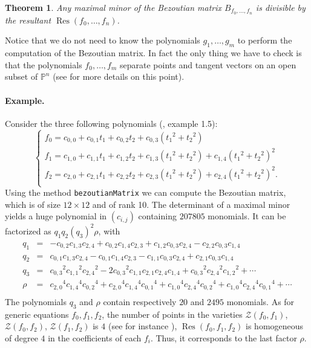 \documentclass[10pt]{amsart}
\theoremstyle{plain}
\newtheorem{thm}{Theorem}[section]
\theoremstyle{definition}
\def\PP{{\mathbb{P}}}
\def\Zc{{\mathcal{Z}}}
\DeclareMathOperator\Res{Res}
\begin{document}
\begin{thm}
  Any maximal minor of the Bezoutian matrix
  $B_{{f}_{0},\ldots,{f}_{n}}$ is divisible by the resultant
  $\Res(f_0,\ldots,f_n)$.
\end{thm}

Notice that we do not need to know the polynomials $g_1,\ldots,g_m$ to perform the computation of the Bezoutian matrix. In fact the only thing we have to check is that the polynomials $f_0,\ldots,f_m$ separate points and tangent vectors on an open subset of $\PP^n$ (see \cite{BEM00} for more details on this point).

\paragraph{Example.} Consider the three following polynomials (\cite{BEM00}, example 1.5):
$$ \left\{
\begin{array}{l}
f_{0} = c_{{0,0}}+c_{{0,1}}t_{1}+c_{{0,2}}t_2+c_{{0,3}}({t_{1}}^{2}+{t_2}^{2})\\
f_{1} = c_{{1,0}}+c_{{1,1}}t_{1}+c_{{1,2}}t_2+c_{{1,3}}({t_{1}}^{2}+{t_2}^{2})
+c_{1,4}({t_{1}}^{2} +{t_2}^{2})^{2} \\
f_{2} =  c_{{2,0}}+c_{{2,1}}t_{1}+c_{{2,2}}t_2+c_{{2,3}}({t_{1}}^{2}+{t_2}^{2})
+c_{2,4}({t_{1}}^{2} +{t_2}^{2})^{2}. \\
\end{array} \right.
$$ 
Using the method {\tt bezoutianMatrix} we can compute the Bezoutian matrix, which is of size $12\times 12$ and of rank 10. The determinant of a maximal minor yields a huge polynomial  in $(c_{i,j})$ containing $2
07805$ monomials. It can be factorized as $q_1q_2(q_{3})^{2}\rho$, with 
$$
\begin{array}{lll}
q_1 & = & -c_{{0,2}}c_{{1,3}}c_{{2,4}}+c_{{0,2}}c_{{1,4}}c_{{2,3}}+c_{{1,2}}c_{{
0,3}}c_{{2,4}}-c_{{2,2}}c_{{0,3}}c_{{1,4}}  \\

q_2 & = & c_{{0,1}}c_{{1,3}}c_{{2,4}}-c_{{0,1}}c_{{1,4}}c_{{2,3}}-c_{{1,1}}c_{{0
,3}}c_{{2,4}}+c_{{2,1}}c_{{0,3}}c_{{1,4}}  \\

q_3 & = & {c_{{0,3}}}^{2}{c_{{1,1}}}^{2}{c_{{2,4}}}^{2} -2{c_{{0,3}}}^{2}c_{{1,1
}}c_{{2,1}}c_{{2,4}}c_{{1,4}} + {c_{{0,3}}}^{2}{c_{{2,4}}}^{2}{c_{{1,2}}}^{2} + 
\cdots \\

\rho & = &  {c_{{2,0}}}^{4}{c_{{1,4}}}^{4}{c_{{0,2}}}^{4} + {c_{{2,0}}}^{4}{c_{{1,4
}}}^{4}{c_{{0,1}}}^{4} + {c_{{1,0}}}^{4}{c_{{2,4}}}^{4}{c_{{0,2}}}^{4} + {c_{{1,
0}}}^{4}{c_{{2,4}}}^{4}{c_{{0,1}}}^{4} + \cdots \\
\end{array}
$$
The polynomials $q_{3}$ and $\rho$ contain respectively $20$ and $2495$
monomials. As for generic equations $f_{0}, f_{1}, f_{2}$,
the number of points in the varieties $\Zc(f_{0},f_{1})$,
$\Zc(f_{0},f_{2})$, $\Zc(f_{1},f_{2})$ is $4$ (see for instance
\cite{MB94mega}), 
 $\Res(f_{0},f_{1},f_{2})$ is homogeneous of degree
$4$ in the coefficients of each $f_{i}$.
Thus, it  corresponds to the last
factor $\rho$.
\end{document}

